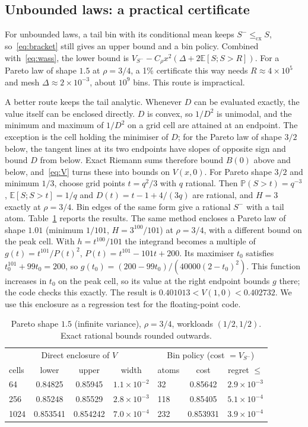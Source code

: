 \documentclass[11pt]{article}
\numberwithin{equation}{section}
\theoremstyle{definition}
\theoremstyle{remark}
\newcommand{\E}{\mathbb{E}}
\newcommand{\Prob}{\mathbb{P}}
\newcommand{\cx}{\le_{\mathrm{cx}}}
\begin{document}
\subsection{Unbounded laws: a practical certificate}

For unbounded laws, a tail bin with its conditional mean keeps $S^-\cx S$, so~\eqref{eq:bracket} still gives an upper bound and a bin policy. Combined with~\eqref{eq:wass}, the lower bound is $V_{S^-}-C_\rho x^2(\Delta+2\E[S;S>R])$. For a Pareto law of shape $1.5$ at $\rho=3/4$, a 1\% certificate this way needs $R\approx4\times10^5$ and mesh $\Delta\approx2\times10^{-3}$, about $10^9$ bins. This route is impractical.

A better route keeps the tail analytic. Whenever $D$ can be evaluated exactly, the value itself can be enclosed directly. $D$ is convex, so $1/D^2$ is unimodal, and the minimum and maximum of $1/D^2$ on a grid cell are attained at an endpoint. The exception is the cell holding the minimiser of $D$; for the Pareto law of shape $3/2$ below, the tangent lines at its two endpoints have slopes of opposite sign and bound $D$ from below. Exact Riemann sums therefore bound $B(0)$ above and below, and~\eqref{eq:V} turns these into bounds on $V(x,0)$. For Pareto shape $3/2$ and minimum $1/3$, choose grid points $t=q^2/3$ with $q$ rational. Then $\Prob(S>t)=q^{-3}$, $\E[S;S>t]=1/q$ and $D(t)=t-1+4/(3q)$ are rational, and $H=3$ exactly at $\rho=3/4$. Bin edges of the same form give a rational $S^-$ with a tail atom. Table~\ref{tab:pareto} reports the results. The same method encloses a Pareto law of shape $1.01$ (minimum $1/101$, $H=3^{100}/101$) at $\rho=3/4$, with a different bound on the peak cell. With $h=t^{100}/101$ the integrand becomes a multiple of $g(t)=t^{101}/P(t)^2$, $P(t)=t^{101}-101t+200$. Its maximiser $t_0$ satisfies $t_0^{101}+99t_0=200$, so $g(t_0)=(200-99t_0)/(40000(2-t_0)^2)$. This function increases in $t_0$ on the peak cell, so its value at the right endpoint bounds $g$ there; the code checks this exactly. The result is $0.401013<V(1,0)<0.402732$. We use this enclosure as a regression test for the floating-point code.

\begin{table}[h]
\centering\small
\caption{Pareto shape $1.5$ (infinite variance), $\rho=3/4$, workloads $(1/2,1/2)$. Exact rational bounds rounded outwards.}\label{tab:pareto}
\begin{tabular}{@{}lccc@{\qquad}lcc@{}}
\toprule
\multicolumn{4}{c}{Direct enclosure of $V$} & \multicolumn{3}{c}{Bin policy (cost $=V_{S^-}$)}\\
cells & lower & upper & width & atoms & cost & regret $\le$\\
\midrule
64 & 0.84825 & 0.85945 & $1.1\times10^{-2}$ & 32 & 0.85642 & $2.9\times10^{-3}$\\
256 & 0.85248 & 0.85529 & $2.8\times10^{-3}$ & 118 & 0.85405 & $5.1\times10^{-4}$\\
1024 & 0.853541 & 0.854242 & $7.0\times10^{-4}$ & 232 & 0.853931 & $3.9\times10^{-4}$\\
\bottomrule
\end{tabular}
\end{table}
\end{document}
